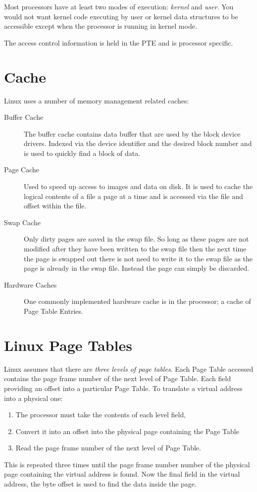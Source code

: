 \documentclass[a4paper,12pt]{book}
\begin{document}
Most processors have at least two modes of execution: \emph{kernel} and
\emph{user}. You would not want kernel code executing by user or kernel data
structures to be accessible except when the processor is running in kernel mode.

The access control information is held in the PTE and is processor specific. 

\section{Cache}
Linux uses a number of memory management related caches:
\begin{description}
\item[Buffer Cache] The buffer cache contains data buffer that are used by the
block device drivers. Indexed via the device identifier and the desired block
number and is used to quickly find a block of data. 
\item[Page Cache] Used to speed up access to images and data on disk. It is used
to cache the logical contents of a file a page at a time and is accessed via the
file and offset within the file. 

\item[Swap Cache] Only dirty pages are saved in the swap file. So long as these
pages are not modified after they have been written to the swap file then the
next time the page is swapped out there is not need to write it to the swap file
as the page is already in the swap file. Instead the page can simply be
discarded. 
\item[Hardware Caches] One commonly implemented hardware cache is in the
processor; a cache of Page Table Entries. 
\end{description}
\section{Linux Page Tables}
Linux assumes that there are \emph{three levels of page tables}. Each Page Table
accessed contains the page frame number of the next level of Page Table. Each
field providing an offset into a particular Page Table. To translate a virtual
address into a physical one:
\begin{enumerate}
 \item The processor must take the contents of each level
field, 
 \item Convert it into an offset into the physical page containing the Page
Table 
  \item Read the page frame number of the next level of Page Table. 
\end{enumerate}
This is repeated three times until the page frame number number of the physical page
containing the virtual address is found. Now the final field in the virtual
address, the byte offset is used to find the data inside the page.
\end{document}

